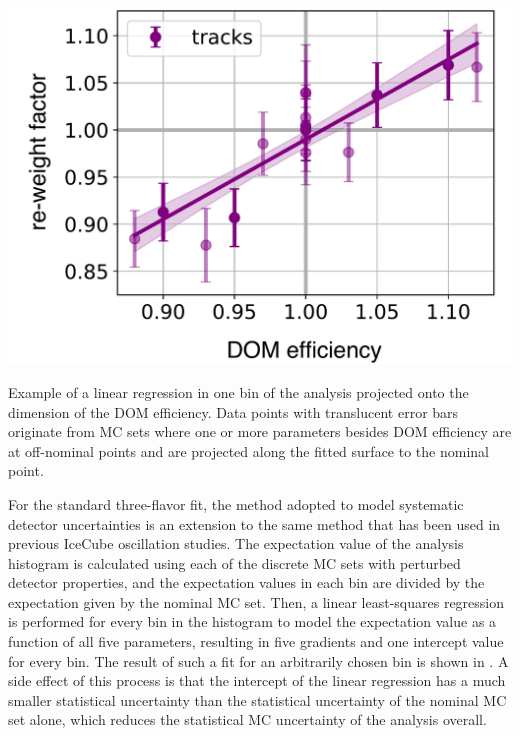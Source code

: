 \begin{marginfigure}[\baselineskip]
    \includegraphics[width=\linewidth]{figures/measurement/systematics/detector/hypersurface_example_v2.pdf} 
    \caption{Example of a linear regression in one bin of the analysis projected onto the dimension of the DOM efficiency. Data points with translucent error bars originate from MC sets where one or more parameters besides DOM efficiency are at off-nominal points and are projected along the fitted surface to the nominal point.}
\end{marginfigure}
For the standard three-flavor fit, the method adopted to model systematic detector uncertainties is an extension to the same method that has been used in previous IceCube oscillation studies\cite{IceCube:2019dqi}. The expectation value of the analysis histogram is calculated using each of the discrete MC sets with perturbed detector properties, and the expectation values in each bin are divided by the expectation given by the nominal MC set. Then, a linear least-squares regression is performed for every bin in the histogram to model the expectation value as a function of all five parameters, resulting in five gradients and one intercept value for every bin. The result of such a fit for an arbitrarily chosen bin is shown in . A side effect of this process is that the intercept of the linear regression has a much smaller statistical uncertainty than the statistical uncertainty of the nominal MC set alone, which reduces the statistical MC uncertainty of the analysis overall.

